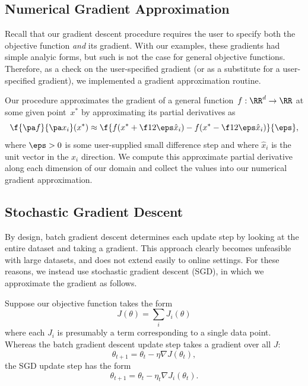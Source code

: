 \documentclass{amsart}
\begin{document}
\subsection{Numerical Gradient Approximation}

Recall that our gradient descent procedure requires the user to specify both the objective function \emph{and} its gradient. With our examples, these gradients had simple analyic forms, but such is not the case for general objective functions. Therefore, as a check on the user-specified gradient (or as a substitute for a user-specified gradient), we implemented a gradient approximation routine.

Our procedure approximates the gradient of a general function~$f:\RR^d\to\RR$ at some given point~$x^*$ by approximating its partial derivatives as
\begin{equation}
\f{\pa f}{\pa x_i}(x^*) \approx \f{f(x^* + \f12\eps\hat x_i) - f(x^* - \f12 \eps\hat x_i)}{\eps},
\end{equation}
where $\eps > 0$ is some user-supplied small difference step and where $\hat x_i$ is the unit vector in the $x_i$ direction. We compute this approximate partial derivative along each dimension of our domain and collect the values into our numerical gradient approximation.



\subsection{Stochastic Gradient Descent}

By design, batch gradient descent determines each update step by looking at the entire dataset and taking a gradient. This approach clearly becomes unfeasible with large datasets, and does not extend easily to online settings. For these reasons, we instead use stochastic gradient descent (SGD), in which we approximate the gradient as follows.

Suppose our objective function takes the form
\begin{equation}
J(\theta) = \sum_i J_i(\theta)
\end{equation}
where each $J_i$ is presumably a term corresponding to a single data point. Whereas the batch gradient descent update step takes a gradient over all $J$:
\begin{equation}
\theta_{t+1} = \theta_t - \eta \nabla J(\theta_t),
\end{equation}
the SGD update step has the form
\begin{equation} \theta_{t+1} = \theta_t - \eta_t \nabla J_i(\theta_t). \end{equation}
\end{document}
